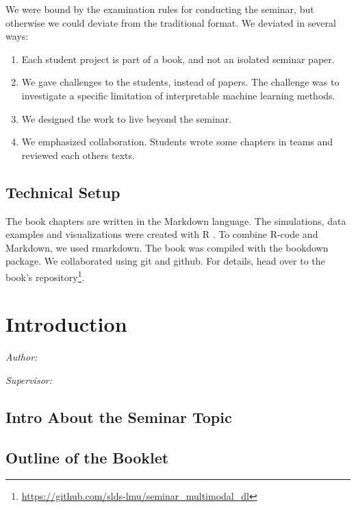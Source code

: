 \documentclass[
]{krantz}
\providecommand{\tightlist}{%
  \setlength{\itemsep}{0pt}\setlength{\parskip}{0pt}}
\renewcommand{\href}[2]{#2\footnote{\url{#1}}}
\begin{document}
We were bound by the examination rules for conducting the seminar, but otherwise we could deviate from the traditional format.
We deviated in several ways:

\begin{enumerate}
\def\labelenumi{\arabic{enumi}.}
\tightlist
\item
  Each student project is part of a book, and not an isolated seminar paper.
\item
  We gave challenges to the students, instead of papers. The challenge was to investigate a specific limitation of interpretable machine learning methods.
\item
  We designed the work to live beyond the seminar.
\item
  We emphasized collaboration. Students wrote some chapters in teams and reviewed each others texts.
\end{enumerate}

\hypertarget{technical-setup}{%
\section*{Technical Setup}\label{technical-setup}}


The book chapters are written in the Markdown language.
The simulations, data examples and visualizations were created with R \citep{rlang}.
To combine R-code and Markdown, we used rmarkdown.
The book was compiled with the bookdown package.
We collaborated using git and github.
For details, head over to the \href{https://github.com/slds-lmu/seminar_multimodal_dl}{book's repository}.

\hypertarget{introduction}{%
\chapter{Introduction}\label{introduction}}

\emph{Author: }

\emph{Supervisor: }

\hypertarget{intro-about-the-seminar-topic}{%
\section{Intro About the Seminar Topic}\label{intro-about-the-seminar-topic}}

\hypertarget{outline-of-the-booklet}{%
\section{Outline of the Booklet}\label{outline-of-the-booklet}}
\end{document}
